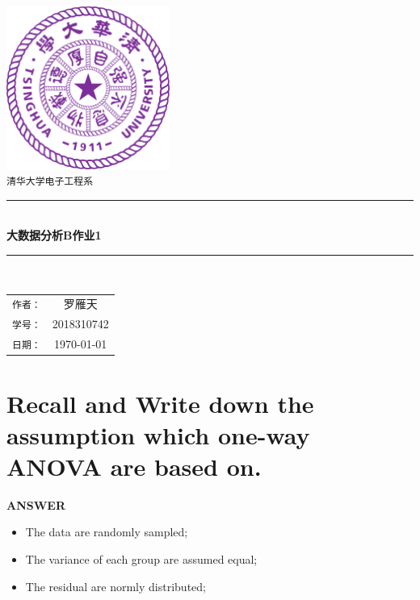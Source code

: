 \documentclass[a4paper]{article}
\begin{document}
\newcommand{\HRule}{\rule{\linewidth}{0.5mm}}
\begin{titlepage}
	\begin{center}
		\includegraphics[width=0.4\textwidth]{Tsinghua2.png}\\[1cm]
		\textsc{\Large \texttt{清华大学电子工程系}}\\[1cm]
		\HRule \\[1cm]
		{\Huge \bfseries 大数据分析B作业1}\\[0.4cm]
		\HRule \\[3.5cm]
		\begin{minipage}{0.4\textwidth}
			\begin{center}
				\Large
				\begin{tabular}{cc}
					\texttt{作者：} & 罗雁天 \\[0.5cm]
					\texttt{学号：} & 2018310742 \\[0.5cm]
					\texttt{日期：} & \today
				\end{tabular}
			\end{center}
		\end{minipage}
		\vfill
	\end{center}
\end{titlepage}


\newpage

\section{Recall and Write down the assumption which one-way ANOVA are based on.}


\textbf{ANSWER}

\begin{itemize}
	\item The data are randomly sampled;
	\item The variance of each group are assumed equal;
	\item The residual are normly distributed;
\end{itemize}
\end{document}
